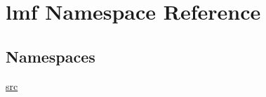 \hypertarget{namespacelmf}{\section{lmf Namespace Reference}
\label{namespacelmf}
}
\subsection*{Namespaces}
\begin{DoxyCompactItemize}
\item 
 \hyperlink{namespacelmf_1_1src}{src}
\end{DoxyCompactItemize}
